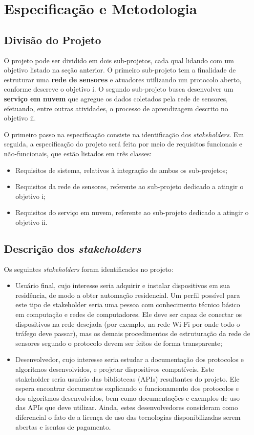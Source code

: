 \chapter{Especificação e Metodologia} \label{chp:espec_metodologia}

\section{Divisão do Projeto}
O projeto pode ser dividido em dois sub-projetos, cada qual lidando com um objetivo listado na seção anterior. O primeiro sub-projeto tem a finalidade de estruturar uma \textbf{rede de sensores} e atuadores utilizando um protocolo aberto, conforme descreve o objetivo i. O segundo sub-projeto busca desenvolver um \textbf{serviço em nuvem} que agregue os dados coletados pela rede de sensores, efetuando, entre outras atividades, o processo de aprendizagem descrito no objetivo ii.

O primeiro passo na especificação consiste na identificação dos \textit{stakeholders}. Em seguida, a especificação do projeto será feita por meio de requisitos funcionais e não-funcionais, que estão listados em três classes:
\begin{itemize}
	\item Requisitos de sistema, relativos à integração de ambos os sub-projetos;
	\item Requisitos da rede de sensores, referente ao sub-projeto dedicado a atingir o objetivo i; 
	\item Requisitos do serviço em nuvem, referente ao sub-projeto dedicado a atingir o objetivo ii.
\end{itemize}

\section{Descrição dos \textit{stakeholders}}
Os seguintes \textit{stakeholders} foram identificados no projeto:
\begin{itemize}
	\item Usuário final, cujo interesse seria adquirir e instalar dispositivos em sua residência, de modo a obter automação residencial. Um perfil possível para este tipo de stakeholder seria uma pessoa com conhecimento técnico básico em computação e redes de computadores. Ele deve ser capaz de conectar os dispositivos na rede desejada (por exemplo, na rede Wi-Fi por onde todo o tráfego deve passar), mas os demais procedimentos de estruturação da rede de sensores segundo o protocolo devem ser feitos de forma transparente;
	\item Desenvolvedor, cujo interesse seria estudar a documentação dos protocolos e algoritmos desenvolvidos, e projetar dispositivos compatíveis. Este stakeholder seria usuário das bibliotecas (APIs) resultantes do projeto. Ele espera encontrar documentos explicando o funcionamento dos protocolos e dos algoritmos desenvolvidos, bem como documentações e exemplos de uso das APIs que deve utilizar. Ainda, estes desenvolvedores consideram como diferencial o fato de a licença de uso das tecnologias disponibilizadas serem abertas e isentas de pagamento.
\end{itemize}


